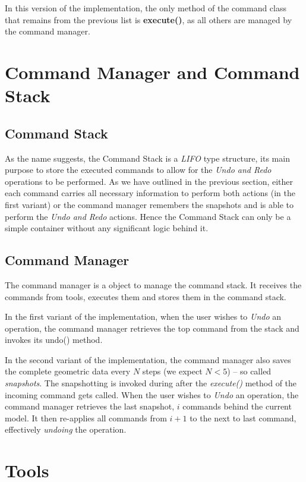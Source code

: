 In this version of the implementation, the only method of the command class that remains from the previous list is \textbf{execute()}, as all others are managed by the command manager.

\section{Command Manager and Command Stack}

\subsection{Command Stack}

As the name suggests, the Command Stack is a \textit{LIFO} type structure, its main purpose to store the executed commands to allow for the \textit{Undo and Redo} operations to be performed. As we have outlined in the previous section, either each command carries all necessary information to perform both actions (in the first variant) or the command manager remembers the snapshots and is able to perform the \textit{Undo and Redo} actions. Hence the Command Stack can only be a simple container without any significant logic behind it.

\subsection{Command Manager}

The command manager is a object to manage the command stack. It receives the commands from tools, executes them and stores them in the command stack.

In the first variant of the implementation, when the user wishes to \textit{Undo} an operation, the command manager retrieves the top command from the stack and invokes its undo() method.

In the second variant of the implementation, the command manager also saves the complete geometric data every $N$ steps (we expect $N < 5$) -- so called \textit{snapshots}. The snapshotting is invoked during after the \textit{execute()} method of the incoming command gets called. When the user wishes to \textit{Undo} an operation, the command manager retrieves the last snapshot, $i$ commands behind the current model. It then re-applies all commands from $i+1$ to the next to last command, effectively \textit{undoing} the operation.

\section{Tools}


